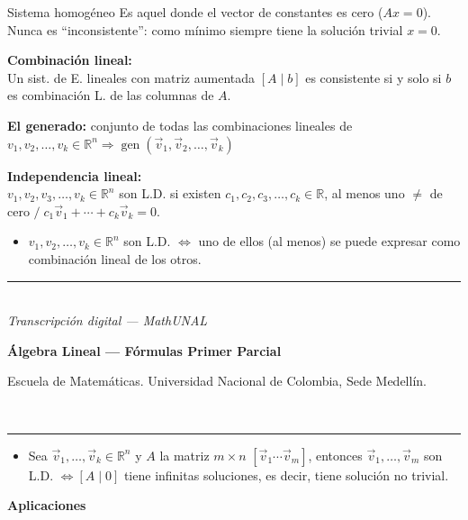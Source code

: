 \documentclass[11pt]{article}
\newcommand{\examheader}{%
  \noindent
  \begin{minipage}[t]{0.6\linewidth}
    {\small\bfseries Álgebra Lineal --- Fórmulas Primer Parcial}\\
  \end{minipage}%
  \hfill
  \begin{minipage}[t]{0.35\linewidth}
    \raggedleft\small Escuela de Matemáticas. Universidad Nacional de Colombia, Sede Medellín.
  \end{minipage}\\[2pt]
  \rule{\linewidth}{0.6pt}
}
\newcommand{\examfooter}{%
  \vfill
  \rule{\linewidth}{0.4pt}\\[1pt]
  {\scriptsize\textit{Transcripción digital --- MathUNAL}\hfill\textcolor{unalblue}{\textbf{\thepage}}}
}
\begin{document}
\vspace{0.2cm}
\begin{defbox4}{Sistema homogéneo}
Es aquel donde el vector de constantes es cero ($Ax=0$). Nunca es ``inconsistente'': como mínimo siempre tiene la solución trivial $x=0$.
\end{defbox4}

\vspace{0.3cm}
\textbf{Combinación lineal:}\\
Un sist. de E. lineales con matriz aumentada $[A \mid b]$ es consistente si y solo si $b$ es combinación L. de las columnas de $A$.

\vspace{0.2cm}
\textbf{El generado:} conjunto de todas las combinaciones lineales de $v_1,v_2,\ldots,v_k \in \mathbb{R}^n \Rightarrow \operatorname{gen}(\vec v_1,\vec v_2,\ldots,\vec v_k)$

\vspace{0.3cm}
{\bfseries\color{purple1} Independencia lineal:}\\
$v_1,v_2,v_3,\ldots,v_k \in \mathbb{R}^n$ son L.D. si existen $c_1,c_2,c_3,\ldots,c_k \in \mathbb{R}$, al menos uno $\neq$ de cero $/\; c_1\vec v_1+\cdots+c_k\vec v_k = 0$.

\begin{itemize}[leftmargin=1.2em]
\item $v_1,v_2,\ldots,v_k \in \mathbb{R}^n$ son L.D. $\iff$ uno de ellos (al menos) se puede expresar como combinación lineal de los otros.
\end{itemize}

\examfooter
\newpage

\examheader

\begin{itemize}[leftmargin=1.2em]
\item Sea $\vec v_1,\ldots,\vec v_k \in \mathbb{R}^n$ y $A$ la matriz $m\times n$ $[\vec v_1 \cdots \vec v_m]$, entonces $\vec v_1,\ldots,\vec v_m$ son L.D. $\iff [A \mid 0]$ tiene infinitas soluciones, es decir, tiene solución no trivial.
\end{itemize}

\vspace{0.3cm}
{\bfseries\color{magenta1} Aplicaciones}
\end{document}
